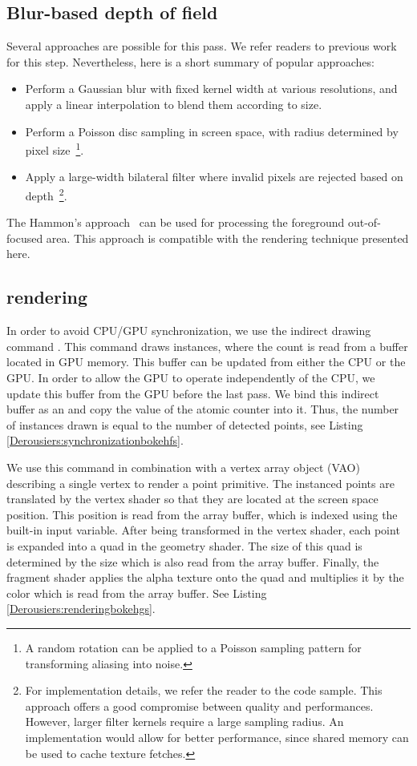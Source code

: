 \subsection{Blur-based depth of field}
Several approaches are possible for this pass. We refer readers to previous work for this step. Nevertheless, here is a short summary of popular approaches:
\begin{itemize}
	\item Perform a Gaussian blur with fixed kernel width at various resolutions, and apply a linear interpolation to blend them according to \coc size.
	\item Perform a Poisson disc sampling in screen space, with radius determined by pixel \coc size~\footnote{A random rotation can be applied to a Poisson sampling pattern for transforming aliasing into noise.}.
	\item Apply a large-width bilateral filter where invalid pixels are rejected based on depth~\footnote{For implementation details, we refer the reader to the code sample. This approach offers a good compromise between quality and performances. However, larger filter kernels require a large sampling radius. An \opencl implementation would allow for better performance, since shared memory can be used to cache texture fetches.}.
\end{itemize}

The Hammon's approach~\cite{Hammon07} can be used for processing the foreground out-of-focused area. This approach is compatible with the \bokeh rendering technique presented here. 

\subsection{\Bokeh rendering}
In order to avoid CPU/GPU synchronization, we use the indirect drawing command . This command draws instances, where the count is read from a buffer located in GPU memory. This buffer can be updated from either the CPU or the GPU. In order to allow the GPU to operate independently of the CPU, we update this buffer from the GPU before the last pass. We bind this indirect buffer as an  and copy the value of the atomic counter into it. Thus, the number of instances drawn is equal to the number of detected \bokeh points, see Listing \ref{Derousiers:synchronizationbokehfs}. 

We use this command in combination with a vertex array object (VAO) describing a single vertex to render a point primitive. The instanced points are translated by the vertex shader so that they are located at the screen space \bokeh position. This position is read from the   array buffer, which is indexed using the built-in  input variable. After being transformed in the vertex shader, each point is expanded into a quad in the geometry shader. The size of this quad is determined by the \bokeh size which is also read from the   array buffer. Finally, the fragment shader applies the alpha texture \bokeh onto the quad and multiplies it by the \bokeh color which is read from the  array buffer. See Listing \ref{Derousiers:renderingbokehgs}.

